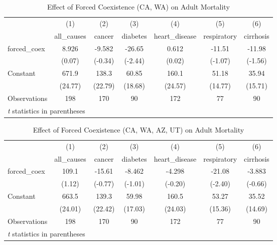 \documentclass[12pt]{article}
\begin{document}
\begin{table}[htbp]\centering \caption{Effect of Forced Coexistence (CA, WA) on Adult Mortality\label{adult2}} \begin{tabular}{l*{6}{c}} \toprule
                    &\multicolumn{1}{c}{(1)}&\multicolumn{1}{c}{(2)}&\multicolumn{1}{c}{(3)}&\multicolumn{1}{c}{(4)}&\multicolumn{1}{c}{(5)}&\multicolumn{1}{c}{(6)}\\
                    &\multicolumn{1}{c}{all\_causes}&\multicolumn{1}{c}{cancer}&\multicolumn{1}{c}{diabetes}&\multicolumn{1}{c}{heart\_disease}&\multicolumn{1}{c}{respiratory}&\multicolumn{1}{c}{cirrhosis}\\
\midrule
forced\_coex         &       8.926&      -9.582&      -26.65&       0.612&      -11.51&      -11.98\\
                    &      (0.07)&     (-0.34)&     (-2.44)&      (0.02)&     (-1.07)&     (-1.56)\\
\addlinespace
Constant            &       671.9&       138.3&       60.85&       160.1&       51.18&       35.94\\
                    &     (24.77)&     (22.79)&     (18.68)&     (24.57)&     (14.77)&     (15.71)\\
\midrule
Observations        &         198&         170&          90&         172&          77&          90\\
\bottomrule
\multicolumn{7}{l}{\footnotesize \textit{t} statistics in parentheses}\\
\end{tabular}
\end{table}

\begin{table}[htbp]\centering \caption{Effect of Forced Coexistence (CA, WA, AZ, UT) on Adult Mortality\label{adult3}} \begin{tabular}{l*{6}{c}} \toprule
                    &\multicolumn{1}{c}{(1)}&\multicolumn{1}{c}{(2)}&\multicolumn{1}{c}{(3)}&\multicolumn{1}{c}{(4)}&\multicolumn{1}{c}{(5)}&\multicolumn{1}{c}{(6)}\\
                    &\multicolumn{1}{c}{all\_causes}&\multicolumn{1}{c}{cancer}&\multicolumn{1}{c}{diabetes}&\multicolumn{1}{c}{heart\_disease}&\multicolumn{1}{c}{respiratory}&\multicolumn{1}{c}{cirrhosis}\\
\midrule
forced\_coex         &       109.1&      -15.61&      -8.462&      -4.298&      -21.08&      -3.883\\
                    &      (1.12)&     (-0.77)&     (-1.01)&     (-0.20)&     (-2.40)&     (-0.66)\\
\addlinespace
Constant            &       663.5&       139.3&       59.98&       160.5&       53.27&       35.52\\
                    &     (24.01)&     (22.42)&     (17.03)&     (24.03)&     (15.36)&     (14.69)\\
\midrule
Observations        &         198&         170&          90&         172&          77&          90\\
\bottomrule
\multicolumn{7}{l}{\footnotesize \textit{t} statistics in parentheses}\\
\end{tabular}
\end{table}
\end{document}
